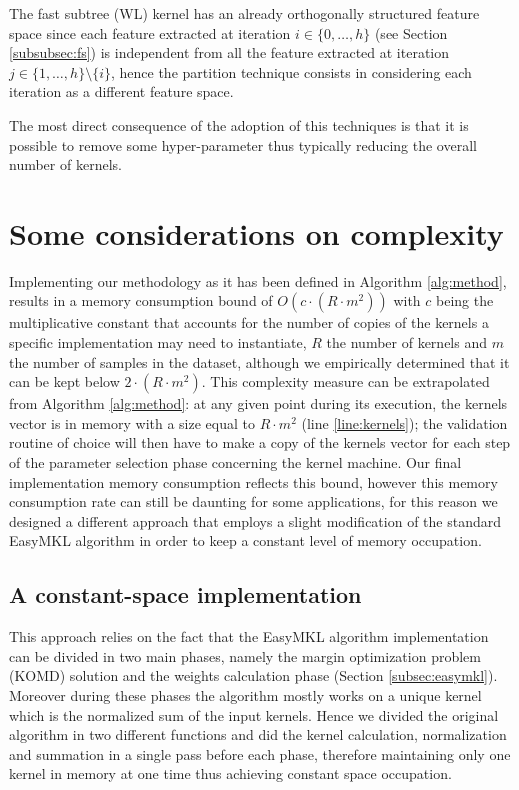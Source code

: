 The fast subtree (WL) kernel has an already orthogonally structured feature
space since each feature extracted at iteration $i \in \{0,\dots,h\}$ (see Section \ref{subsubsec:fs})
is independent from all the feature extracted at iteration $j \in \{1,\dots,h\}\setminus \{i\}$,
hence the partition technique consists in considering each iteration as a different
feature space.

The most direct consequence of the adoption of this techniques is that it is
possible to remove some hyper-parameter thus typically reducing the
overall number of kernels.


\section{Some considerations on complexity}

Implementing our methodology as it has been defined in Algorithm \ref{alg:method},
results in a memory consumption bound of $O(c \cdot (R\cdot m^2))$ with $c$ being
the multiplicative constant that accounts for the number of copies of the kernels
a specific implementation may need to instantiate, $R$ the number of kernels and
$m$ the number of samples in the dataset, although we empirically determined that
it can be kept below $2\cdot (R\cdot m^2)$.
This complexity measure can be extrapolated from  Algorithm \ref{alg:method}:
at any given point during its execution, the kernels vector is in
memory with a size equal to $R\cdot m^2$ (line \ref{line:kernels});
the validation routine of choice will then have to make a copy of the kernels vector
for each step of the parameter selection phase concerning the kernel machine.
Our final implementation memory consumption reflects this bound, however this
memory consumption rate can still be daunting for some applications,
for this reason we designed a different approach that employs a slight modification
of the standard EasyMKL algorithm \cite{aiolli2015easymkl} in order to keep a
constant level of memory occupation.

\subsection{A constant-space implementation}
\label{subsec:opt}
This approach relies on the fact that the EasyMKL algorithm implementation can
be divided in two main phases, namely the margin optimization problem (KOMD)
solution and the weights calculation phase (Section \ref{subsec:easymkl}).
Moreover during these phases the algorithm mostly works on a unique kernel which is
the normalized sum of the input kernels.
Hence we divided the original algorithm in two different functions and did
the kernel calculation, normalization and summation in a single pass before each phase,
therefore maintaining only one kernel in memory at one time thus achieving constant
space occupation.

